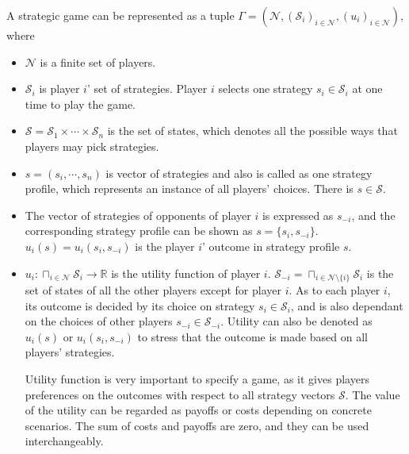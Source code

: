 
A strategic game can be represented as a tuple $\Gamma = (\mathcal{N}, (\mathcal{S}_i)_{i \in \mathcal{N}}, (u_i)_{i\in \mathcal{N}})$, where 
\begin{itemize}
\item $\mathcal{N}$ is a finite set of players.
\item $\mathcal{S}_i$ is player $i$' set of strategies.
Player $i$ selects one strategy $s_i\in \mathcal{S}_i$ at one time to play the game.
\item $\mathcal{S} = \mathcal{S}_1\times\cdots\times \mathcal{S}_n$ is the set of states, which denotes all the possible ways that players may pick strategies.

\item $s=(s_i,\cdots,s_n)$ is vector of strategies and also is called as one strategy profile, which represents an instance of all players' choices.
There is $s\in \mathcal{S}$.

\item The vector of strategies of opponents of player $i$ is expressed as $s_{-i}$, and the corresponding strategy profile can be shown as $s=\{s_i, s_{-i}\}$.
$u_i(s) = u_i(s_i, s_{-i})$ is the player $i$' outcome in strategy profile $s$.

\item $u_i:\sqcap_{i\in \mathcal{N}}\mathcal{S}_i\rightarrow \mathbb{R} $ is the utility function of player $i$.
$\mathcal{S}_{-i}=\sqcap_{i\in \mathcal{N}\setminus \{i\}}\mathcal{S}_i$ is the set of states of all the other players except for player $i$.
As to each player $i$, its outcome is decided by its choice on strategy $s_i\in \mathcal{S}_i$, and is also dependant on the choices of other players $s_{-i}\in \mathcal{S}_{-i}$.
Utility can also be denoted as $u_i(s)$ or $u_i(s_i,s_{-i})$ to stress that the outcome is made based on all players' strategies.


Utility function is very important to specify a game, as it gives players preferences on the outcomes with respect to all strategy vectors $\mathcal{S}$.
The value of the utility can be regarded as payoffs or costs depending on concrete scenarios.
The sum of costs and payoffs are zero, and they can be used interchangeably.
\end{itemize}




